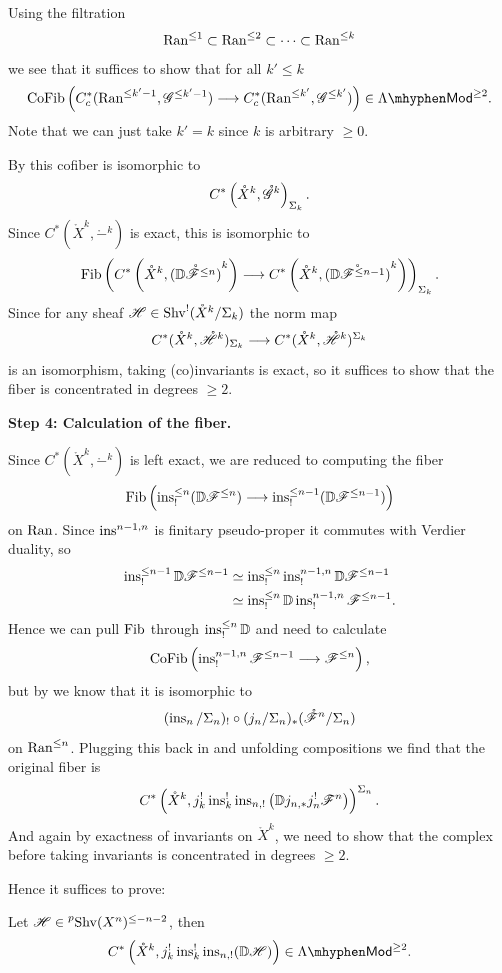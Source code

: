 \documentclass[oneside]{amsart}
\newcommand{\pShv}{\prescript{p}{}{\Shv}}
\begin{document}
Using the filtration
\[
\operatorname{Ran}^{\le 1}\subset \operatorname{Ran}^{\le 2}\subset \dots\subset \operatorname{Ran}^{\le k}
\] 
we see that it suffices to show that for all $k'\le k$
\[
\CoFib \left( C^{*}_c(\Ran^{\le k'-1},\CG^{\le k'-1}) \to C^{*}_c(\Ran^{\le k'},\CG^{\le k'}) \right) \in \lMod^{\ge 2}.
\] 
Note that we can just take $k'=k$ since $k$ is arbitrary $\ge 0$.

By  this cofiber is isomorphic to
\[
	C^{*}\left( \mathring{X}^{k},\mathring{\mathscr{G}}^{k} \right)_{\Sigma_k}. 
\] 
Since $C^{*}(\mathring{X}^{k},\mathring{-}^{k})$ is exact, this is isomorphic to
\[
	\Fib\left( C^{*}\left( \mathring{X}^{k},\mathring{(\VD\CF^{\le n})}^{k} \right) \to C^{*}\left( \mathring{X}^{k}, \mathring{(\VD\CF^{\le n-1})}^{k} \right)  \right)_{\Sigma_k}.
\] 
Since for any sheaf $\mathscr{H}\in \operatorname{Shv}^{!}(\mathring{X}^{k} /\Sigma_k)$ the norm map
\[
	C^{*}(\mathring{X}^{k},\mathring{\CH}^{k})_{\Sigma_k} \to C^{*}(\mathring{X}^{k},\mathring{\CH}^{k})^{\Sigma_k}
\] 
is an isomorphism, taking (co)invariants is exact, so it suffices to show that the fiber is concentrated in degrees $\ge 2$.

\textbf{Step 4: Calculation of the fiber.}

Since $C^{*}(\mathring{X}^{k},\mathring{-}^{k})$ is left exact, we are reduced to computing the fiber
\[
\Fib \left( \ins^{\le n}_!(\VD\CF^{\le n}) \to \ins^{\le n-1}_!(\VD\CF^{\le n-1}) \right) 
\] 
on $\operatorname{Ran}$. Since $\operatorname{ins}^{n-1,n}$ is finitary pseudo-proper it commutes with Verdier duality, so
\begin{align*}
	\operatorname{ins}_!^{\le n-1} \mathbb{D}\mathscr{F}^{\le n-1} &\simeq \operatorname{ins}_!^{\le n}\operatorname{ins}_!^{n-1,n} \mathbb{D}\mathscr{F}^{\le n-1} \\
					    &\simeq \operatorname{ins}_!^{\le n} \mathbb{D}\operatorname{ins}_!^{n-1,n}\mathscr{F}^{\le n-1}.
\end{align*}
Hence we can pull $\operatorname{Fib}$ through $\operatorname{ins}_!^{\le n}\mathbb{D}$ and need to calculate
\[
\CoFib\left( \ins_!^{n-1,n}\CF^{\le n-1} \to \CF^{\le n} \right) ,
\] 
but by  we know that it is isomorphic to
\[
(\operatorname{ins}_{n} /\Sigma_{n})_! \circ (j_{n} /\Sigma_{n})_* (\mathring{\mathscr{F}}^{n} /\Sigma_{n})
\] 
on $\operatorname{Ran}^{\le n}$. Plugging this back in and unfolding compositions we find that the original fiber is
\[
	C^{*}\left( \mathring{X}^{k}, j_k^{!}\operatorname{ins}_k^{!}\operatorname{ins}_{n,!}\left( \mathbb{D} j_{n,*} j_n^{!}\mathscr{F}^{n} \right) \right)^{\Sigma_n}. 
\] 
And again by exactness of invariants on $\mathring{X}^{k}$, we need to show that the complex before taking invariants is concentrated in degrees $\ge 2$.

Hence it suffices to prove:
\begin{lemma}\label{lmm:xkcoh}
	Let $\CH\in \pShv(X^{n})^{\le -n-2}$, then
	\[
		C^{*}\left( \mathring{X}^{k},j_k^{!}\ins_k^{!}\ins_{n,!}(\VD\CH) \right) \in \lMod^{\ge 2}.
	\] 
\end{lemma}
\end{document}

